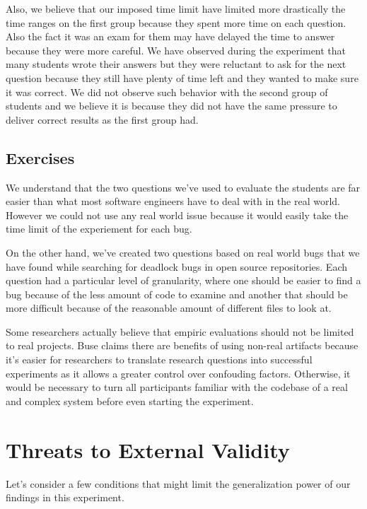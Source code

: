 Also, we believe that our imposed time limit have limited more drastically the time ranges on the first group because they spent more time on each question. Also the fact it was an exam for them may have delayed the time to answer because they were more careful. We have observed during the experiment that many students wrote their answers but they were reluctant to ask for the next question because they still have plenty of time left and they wanted to make sure it was correct. We did not observe such behavior with the second group of students and we believe it is because they did not have the same pressure to deliver correct results as the first group had.

\subsection{Exercises}

We understand that the two questions we've used to evaluate the students are far easier than what most software engineers have to deal with in the real world. However we could not use any real world issue because it would easily take the time limit of the experiement for each bug.

On the other hand, we've created two questions based on real world bugs that we have found while searching for deadlock bugs in open source repositories. Each question had a particular level of granularity, where one should be easier to find a bug because of the less amount of code to examine and another that should be more difficult because of the reasonable amount of different files to look at.

Some researchers actually believe that empiric evaluations should not be limited to real projects. Buse claims there are benefits of using non-real artifacts \cite{buse} because it's easier for researchers to translate research questions into successful experiments as it allows a greater control over confouding factors. Otherwise, it would be necessary to turn all participants familiar with the codebase of a real and complex system before even starting the experiment. 

\section{Threats to External Validity}

Let's consider a few conditions that might limit the generalization power of our findings in this experiment.

